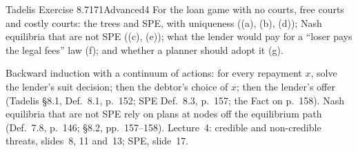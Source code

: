 \begin{exsol}{Tadelis Exercise 8.7}{171}{Advanced}{4}
\asked For the loan game with no courts, free courts and costly courts: the trees and SPE, with
uniqueness ((a), (b), (d)); Nash equilibria that are not SPE ((c), (e)); what the lender would pay
for a ``loser pays the legal fees'' law (f); and whether a planner should adopt it (g).

\method Backward induction with a continuum of actions: for every repayment $x$, solve the
lender's suit decision; then the debtor's choice of $x$; then the lender's offer (Tadelis \S8.1,
Def.~8.1, p.~152; SPE Def.~8.3, p.~157; the Fact on p.~158). Nash equilibria that are not SPE
rely on plans at nodes off the equilibrium path (Def.~7.8, p.~146; \S8.2, pp.~157--158).
Lecture~4: credible and non-credible threats, slides~8, 11 and~13; SPE, slide~17.


\end{exsol}
